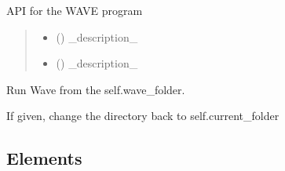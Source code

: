 \documentclass[letterpaper,10pt,english]{sphinxmanual}
\begin{document}
\begin{fulllineitems}
\label{\detokenize{API:wavepy.wave_API.WaveAPI}}
\pysigstartsignatures
{}
\pysigstopsignatures
\sphinxAtStartPar
API for the WAVE program
\begin{quote}\begin{description}
\begin{itemize}
\item {} 
\sphinxAtStartPar
{} () \textendash{} \_description\_

\item {} 
\sphinxAtStartPar
{} () \textendash{} \_description\_

\end{itemize}

\end{description}\end{quote}

\begin{fulllineitems}
\label{\detokenize{API:wavepy.wave_API.WaveAPI.run}}
\pysigstartsignatures
{}
\pysigstopsignatures
\sphinxAtStartPar
Run Wave from the self.wave\_folder.

\sphinxAtStartPar
If given, change the directory back to self.current\_folder

\end{fulllineitems}


\end{fulllineitems}



\subsection{Elements}
\label{\detokenize{API:elements}}
\end{document}
